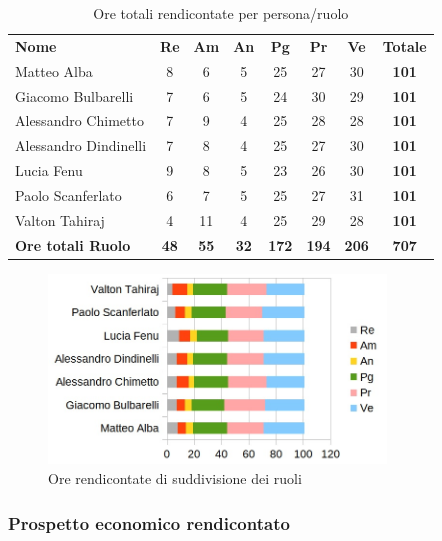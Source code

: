 		\begin{table} [h!]
			\begin{center}
				\begin{tabular} { m{3.5cm} c c c c c c c }
					\rowcolor{lightgray}
					\textbf{Nome} & \textbf{Re} & \textbf{Am} & \textbf{An} & \textbf{Pg} & \textbf{Pr} & \textbf{Ve} & \textbf{Totale} \\
					Matteo Alba & 8 & 6 & 5 & 25 & 27 & 30 & \textbf{101} \\
					Giacomo Bulbarelli & 7 & 6 & 5 & 24 & 30 & 29 & \textbf{101} \\
					Alessandro Chimetto & 7 & 9 & 4 & 25 & 28 & 28 & \textbf{101} \\
					Alessandro Dindinelli & 7 & 8 & 4 & 25 & 27 & 30 & \textbf{101} \\
					Lucia Fenu & 9 & 8 & 5 & 23 & 26 & 30 & \textbf{101} \\
					Paolo Scanferlato & 6 & 7 & 5 & 25 & 27 & 31 & \textbf{101} \\
					Valton Tahiraj & 4 & 11 & 4 & 25 & 29 & 28 & \textbf{101} \\
					\textbf{Ore totali Ruolo} & \textbf{48} & \textbf{55} & \textbf{32} & \textbf{172} & \textbf{194}& \textbf{206} & \textbf{707}
				\end{tabular}
				\caption{Ore totali rendicontate per persona/ruolo}
			\end{center}
		\end{table}
	
		\begin{figure} [h!]
			\centering
			\includegraphics[width=0.8\textwidth]{res/img/grafici/ore_rendicontate.jpg}
			\caption{Ore rendicontate di suddivisione dei ruoli} 
		\end{figure}
	
	\newpage
	
	\subsubsection{Prospetto economico rendicontato}
	
